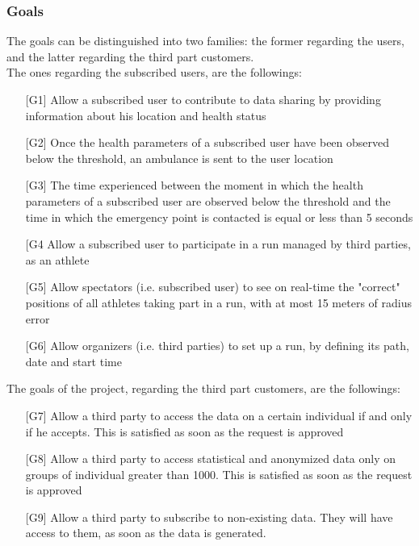 \subsubsection{Goals}
The goals can be distinguished into two families: the former regarding the users, and the latter regarding the third part customers.\\
The ones regarding the subscribed users, are the followings:
\begin{enumerate}
\item[{[G1]}] Allow a subscribed user to contribute to data sharing by providing information about his location and health status
\item[{[G2]}] Once the health parameters of a subscribed user have been observed 
below the threshold, an ambulance is sent to the user location 
\item[{[G3]}] The time experienced between the moment in which the health parameters of a subscribed user are observed below the threshold and the time in which the emergency point is contacted is equal or less than 5 seconds
\item[{[G4}] Allow a subscribed user to participate in a run managed by third parties, as an athlete
\item[{[G5]}] Allow spectators (i.e. subscribed user) to see on real-time the "correct" positions of all athletes taking part in a run, with at most 15 meters of radius error
\item[{[G6]}] Allow organizers (i.e. third parties) to set up a run, by defining its path, date and start time
\end{enumerate}
The goals of the project, regarding the third part customers, are the followings:
\begin{enumerate}
\item[{[G7]}] Allow a third party to access the data on a certain individual if and only if he accepts. This is satisfied as soon as the request is approved
\item[{[G8]}] Allow a third party to access statistical and anonymized data only on groups of individual greater than 1000. This is satisfied as soon as the request is approved
\item[{[G9]}] Allow a third party to subscribe to non-existing data. They will have access to them, as soon as the data is generated. 
\end{enumerate}